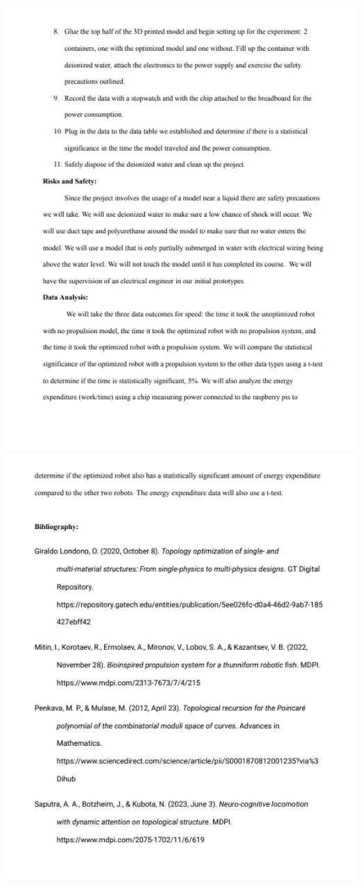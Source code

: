 \documentclass{article}
\begin{document}
\newpage
\includegraphics[width=\textwidth]{media/image10}
\newpage
\includegraphics[width=\textwidth]{media/image28}
\end{document}
